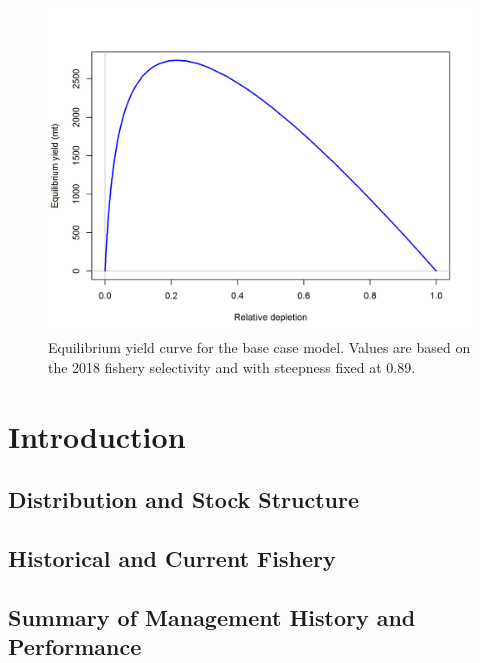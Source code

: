 \documentclass[12pt,]{article}
\begin{document}
\FloatBarrier

\begin{figure}[htbp]
\centering
\includegraphics{r4ss/plots_mod1/yield1_yield_curve.png}
\caption{Equilibrium yield curve for the base case model. Values are
based on the 2018 fishery selectivity and with steepness fixed at 0.89.
\label{fig:Yield_all}}
\end{figure}

\FloatBarrier

\newpage

\renewcommand{\thefigure}{\arabic{figure}}
\renewcommand{\thetable}{\arabic{table}}

\setcounter{figure}{0} \setcounter{table}{0}


\section{Introduction}\label{introduction}

\subsection{Distribution and Stock
Structure}\label{distribution-and-stock-structure}

\subsection{Historical and Current
Fishery}\label{historical-and-current-fishery}

\subsection{Summary of Management History and
Performance}\label{summary-of-management-history-and-performance}
\end{document}

